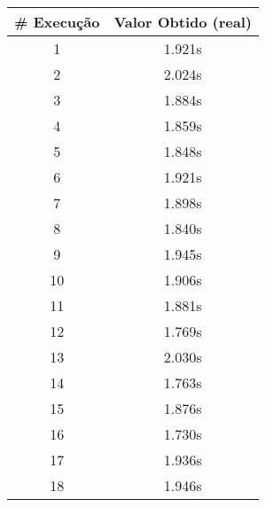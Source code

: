 \documentclass[11pt]{article}
\begin{document}
\begin{table}[!h]
\begin{center}
\begin{minipage}{0.48\textwidth}
\begin{tabular}{| c | c |}
			\hline
				\textbf{\# Execução} &  \textbf{Valor Obtido (real)} \\ \hline
				1 & 1.921s \\ \hline
				2 & 2.024s \\ \hline
				3 & 1.884s \\ \hline
				4 & 1.859s \\ \hline
				5 & 1.848s \\ \hline
				6 & 1.921s \\ \hline
				7 & 1.898s \\ \hline
				8 & 1.840s \\ \hline
				9 & 1.945s \\ \hline
				10 & 1.906s \\ \hline
				11 & 1.881s \\ \hline
				12 & 1.769s \\ \hline
				13 & 2.030s \\ \hline
				14 & 1.763s \\ \hline
				15 & 1.876s \\ \hline
				16 & 1.730s \\ \hline
				17 & 1.936s \\ \hline
				18 & 1.946s \\ \hline
			\end{tabular}
		\end{minipage}
	\end{center}
\end{table}
\end{document}
